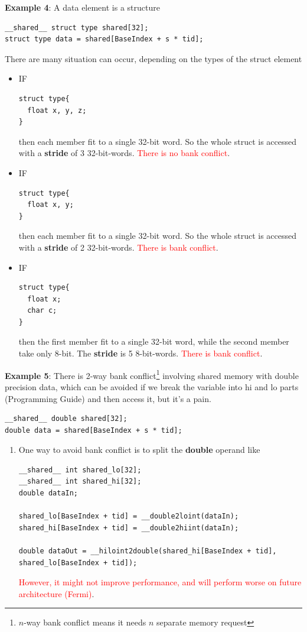 {\bf Example 4}: A data element is a structure
\begin{lstlisting}
__shared__ struct type shared[32];
struct type data = shared[BaseIndex + s * tid];
\end{lstlisting}
There are many situation can occur, depending on the types of the
struct element
\begin{itemize}
\item IF 
\begin{lstlisting}
struct type{
  float x, y, z;
}
\end{lstlisting}
  then each member fit to a single 32-bit word. So the whole struct is
  accessed with a {\bf stride} of 3
  32-bit-words. \textcolor{red}{There is no bank conflict}.

\item IF 
\begin{lstlisting}
struct type{
  float x, y;
}
\end{lstlisting}
  then each member fit to a single 32-bit word. So the whole struct is
  accessed with a {\bf stride} of 2 32-bit-words.
  \textcolor{red}{There is bank conflict}.

\item IF 
\begin{lstlisting}
struct type{
  float x;
  char c;
}
\end{lstlisting}
  then the first member fit to a single 32-bit word, while the second
  member take only 8-bit. The {\bf stride} is 5 8-bit-words.
  \textcolor{red}{There is bank conflict}.
\end{itemize}

{\bf Example 5}: There is 2-way bank
conflict\footnote{$n$-way bank conflict means it needs $n$ separate
  memory request}
involving shared memory with double precision data, which can be
avoided if we break the variable into hi and lo parts (Programming
Guide) and then access it, but it's a pain.
\begin{lstlisting}
__shared__ double shared[32];
double data = shared[BaseIndex + s * tid];
\end{lstlisting}
\begin{enumerate}
\item One way to avoid bank conflict is to split the {\bf double}
  operand like
\begin{lstlisting}
__shared__ int shared_lo[32];
__shared__ int shared_hi[32];
double dataIn;

shared_lo[BaseIndex + tid] = __double2loint(dataIn);
shared_hi[BaseIndex + tid] = __double2hiint(dataIn);

double dataOut = __hiloint2double(shared_hi[BaseIndex + tid],
shared_lo[BaseIndex + tid]);
\end{lstlisting}
  \textcolor{red}{However, it might not improve performance, and will
    perform worse on future architecture (Fermi)}.

\end{enumerate}



